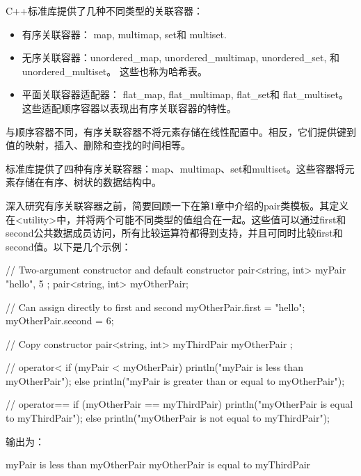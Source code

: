 

C++标准库提供了几种不同类型的关联容器：

\begin{itemize}
\item
有序关联容器： map, multimap, set和 multiset.

\item
无序关联容器：unordered\_map, unordered\_multimap, unordered\_set, 和unordered\_multiset。 这些也称为哈希表。

\item
平面关联容器适配器： flat\_map, flat\_multimap, flat\_set和 flat\_multiset。这些适配顺序容器以表现出有序关联容器的特性。

\end{itemize}


与顺序容器不同，有序关联容器不将元素存储在线性配置中。相反，它们提供键到值的映射，插入、删除和查找的时间相等。

标准库提供了四种有序关联容器：map、multimap、set和multiset。这些容器将元素存储在有序、树状的数据结构中。


深入研究有序关联容器之前，简要回顾一下在第1章中介绍的pair类模板。其定义在<utility>中，并将两个可能不同类型的值组合在一起。这些值可以通过first和second公共数据成员访问，所有比较运算符都得到支持，并且可同时比较first和second值。以下是几个示例：

\begin{cpp}
// Two-argument constructor and default constructor
pair<string, int> myPair { "hello", 5 };
pair<string, int> myOtherPair;

// Can assign directly to first and second
myOtherPair.first = "hello";
myOtherPair.second = 6;

// Copy constructor
pair<string, int> myThirdPair { myOtherPair };

// operator<
if (myPair < myOtherPair) {
    println("myPair is less than myOtherPair");
} else {
    println("myPair is greater than or equal to myOtherPair");
}

// operator==
if (myOtherPair == myThirdPair) {
    println("myOtherPair is equal to myThirdPair");
} else {
    println("myOtherPair is not equal to myThirdPair");
}
\end{cpp}

输出为：

\begin{shell}
myPair is less than myOtherPair
myOtherPair is equal to myThirdPair
\end{shell}

